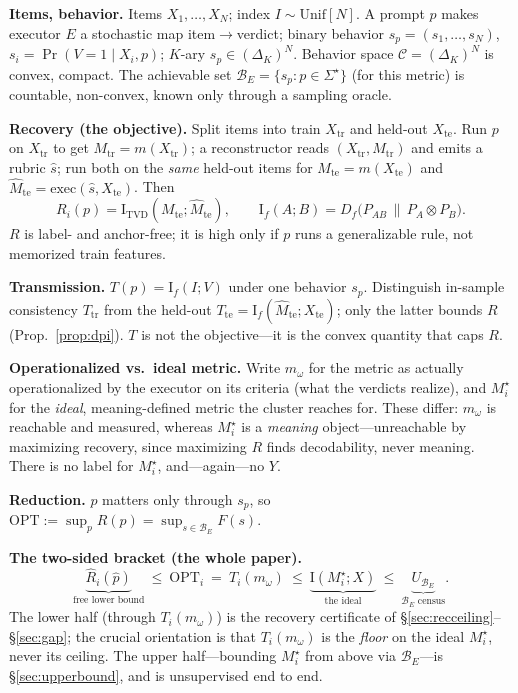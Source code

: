\documentclass[11pt]{article}
\newcommand{\Iv}{\mathrm{I}}
\newcommand{\TVD}{\mathrm{TVD}}
\newcommand{\Mhat}{\widehat{M}}
\newcommand{\Bset}{\mathcal{B}_E}
\newcommand{\Cspace}{\mathcal{C}}
\newcommand{\tr}{\mathrm{tr}}
\newcommand{\te}{\mathrm{te}}
\newcommand{\Mw}{m_\omega}
\newcommand{\Mstar}{M_i^\star}
\begin{document}
\textbf{Items, behavior.} Items $X_1,\dots,X_N$; index $I\sim\mathrm{Unif}[N]$. A prompt $p$ makes
executor $E$ a stochastic map item$\to$verdict; binary behavior $s_p=(s_1,\dots,s_N)$,
$s_i=\Pr(V{=}1\mid X_i,p)$; $K$-ary $s_p\in(\Delta_K)^N$. Behavior space $\Cspace=(\Delta_K)^N$ is convex,
compact. The achievable set $\Bset=\{s_p:p\in\Sigma^\star\}$ (for this metric) is countable, non-convex,
known only through a sampling oracle.

\textbf{Recovery (the objective).} Split items into train $X_\tr$ and held-out $X_\te$. Run $p$ on $X_\tr$
to get $M_\tr=m(X_\tr)$; a reconstructor reads $(X_\tr,M_\tr)$ and emits a rubric $\hat s$; run both on the
\emph{same} held-out items for $M_\te=m(X_\te)$ and $\Mhat_\te=\mathrm{exec}(\hat s,X_\te)$. Then
\[
R_i(p)=\Iv_{\TVD}(M_\te;\Mhat_\te),\qquad \Iv_f(A;B)=D_f\!\big(P_{AB}\,\|\,P_A\otimes P_B\big).
\]
$R$ is label- and anchor-free; it is high only if $p$ runs a generalizable rule, not memorized train
features.

\textbf{Transmission.} $T(p)=\Iv_f(I;V)$ under one behavior $s_p$. Distinguish in-sample consistency
$T_\tr$ from the held-out $T_\te=\Iv_f(\Mhat_\te;X_\te)$; only the latter bounds $R$ (Prop.~\ref{prop:dpi}).
$T$ is not the objective---it is the convex quantity that caps $R$.

\textbf{Operationalized vs.\ ideal metric.} Write $\Mw$ for the metric as actually operationalized by the
executor on its criteria (what the verdicts realize), and $\Mstar$ for the \emph{ideal}, meaning-defined
metric the cluster reaches for. These differ: $\Mw$ is reachable and measured, whereas $\Mstar$ is a
\emph{meaning} object---unreachable by maximizing recovery, since maximizing $R$ finds decodability, never
meaning. There is no label for $\Mstar$, and---again---no $Y$.

\textbf{Reduction.} $p$ matters only through $s_p$, so $\mathrm{OPT}:=\sup_p R(p)=\sup_{s\in\Bset}F(s)$.

\textbf{The two-sided bracket (the whole paper).}
\[
\underbrace{\widehat R_i(\hat p)}_{\text{free lower bound}}
\ \le\ \mathrm{OPT}_i\ =\ T_i(\Mw)
\ \le\ \underbrace{\Iv(\Mstar;X)}_{\text{the ideal}}
\ \le\ \underbrace{U_{\Bset}}_{\text{$\Bset$ census}}.
\]
The lower half (through $T_i(\Mw)$) is the recovery certificate of \S\ref{sec:recceiling}--\S\ref{sec:gap};
the crucial orientation is that $T_i(\Mw)$ is the \emph{floor} on the ideal $\Mstar$, never its ceiling. The
upper half---bounding $\Mstar$ from above via $\Bset$---is \S\ref{sec:upperbound}, and is unsupervised end to
end.
\end{document}
